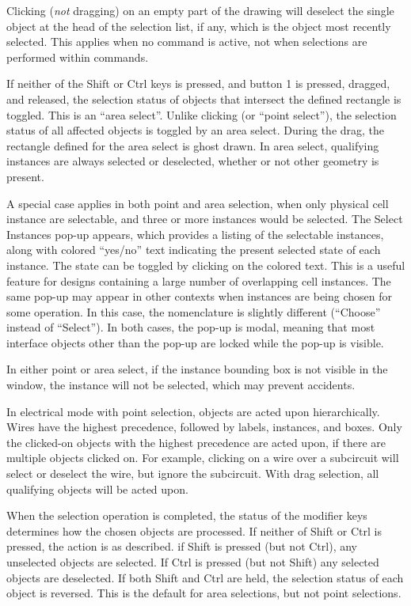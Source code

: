 Clicking ({\it not} dragging) on an empty part of the drawing will
deselect the single object at the head of the selection list, if any,
which is the object most recently selected.  This applies when no
command is active, not when selections are performed within commands.

If neither of the {\kb Shift} or {\kb Ctrl} keys is pressed, and
button 1 is pressed, dragged, and released, the selection status of
objects that intersect the defined rectangle is toggled.  This is an
``area select''.  Unlike clicking (or ``point select''), the selection
status of all affected objects is toggled by an area select.  During
the drag, the rectangle defined for the area select is ghost drawn. 
In area select, qualifying instances are always selected or
deselected, whether or not other geometry is present.

A special case applies in both point and area selection, when only
physical cell instance are selectable, and three or more instances
would be selected.  The {\cb Select Instances} pop-up appears, which
provides a listing of the selectable instances, along with colored
``yes/no'' text indicating the present selected state of each
instance.  The state can be toggled by clicking on the colored text. 
This is a useful feature for designs containing a large number of
overlapping cell instances.  The same pop-up may appear in other
contexts when instances are being chosen for some operation.  In this
case, the nomenclature is slightly different (``Choose'' instead of
``Select'').  In both cases, the pop-up is modal, meaning that most
interface objects other than the pop-up are locked while the pop-up is
visible.

In either point or area select, if the instance bounding box is not
visible in the window, the instance will not be selected, which may
prevent accidents.

In electrical mode with point selection, objects are acted upon
hierarchically.  Wires have the highest precedence, followed by
labels, instances, and boxes.  Only the clicked-on objects with the
highest precedence are acted upon, if there are multiple objects
clicked on.  For example, clicking on a wire over a subcircuit will
select or deselect the wire, but ignore the subcircuit.  With drag
selection, all qualifying objects will be acted upon.

When the selection operation is completed, the status of the modifier
keys determines how the chosen objects are processed.  If neither of
{\kb Shift} or {\kb Ctrl} is pressed, the action is as described.  if
{\kb Shift} is pressed (but not {\kb Ctrl}), any unselected objects
are selected.  If {\kb Ctrl} is pressed (but not {\kb Shift}) any
selected objects are deselected.  If both {\kb Shift} and {\kb Ctrl}
are held, the selection status of each object is reversed.  This is
the default for area selections, but not point selections.


